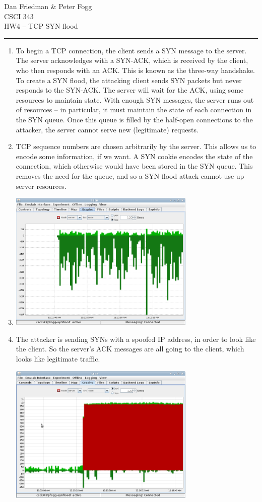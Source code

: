 \documentclass[11pt]{article}
\renewcommand{\maketitle}{
  \begin{center}
    \begin{flushright}
      Dan Friedman \& Peter Fogg \\
      CSCI 343 \\
      HW4 -- TCP SYN flood
    \end{flushright}
    \rule{\linewidth}{0.1mm}
  \end{center}
}
\begin{document}
\maketitle
\begin{enumerate}
\item To begin a TCP connection, the client sends a SYN message to the server. The server acknowledges with a SYN-ACK, which is received by the client, who then responds with an ACK. This is known as the three-way handshake. To create a SYN flood, the attacking client sends SYN packets but never responds to the SYN-ACK. The server will wait for the ACK, using some resources to maintain state. With enough SYN messages, the server runs out of resources -- in particular, it must maintain the state of each connection in the SYN queue. Once this queue is filled by the half-open connections to the attacker, the server cannot serve new (legitimate) requests.
\item TCP sequence numbers are chosen arbitrarily by the server. This allows us to encode some information, if we want. A SYN cookie encodes the state of the connection, which otherwise would have been stored in the SYN queue. This removes the need for the queue, and so a SYN flood attack cannot use up server resources.
\item \text{}
  \begin{center}
    \includegraphics[width=3.5in]{green-traffic.png}
  \end{center}
\item The attacker is sending SYNs with a spoofed IP address, in order to look like the client. So the server's ACK messages are all going to the client, which looks like legitimate traffic.
  \begin{center}
    \includegraphics[width=3.5in]{red-traffic.png}

\end{center}
\end{enumerate}
\end{document}
